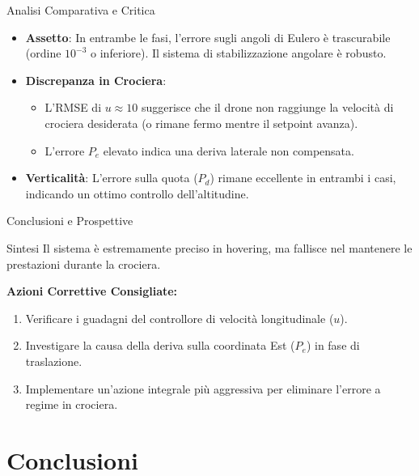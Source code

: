 \documentclass[aspectratio=169]{beamer} %
\begin{document}
\begin{frame}{Analisi Comparativa e Critica}
    \begin{itemize}
        \item \textbf{Assetto}: In entrambe le fasi, l'errore sugli angoli di Eulero è trascurabile (ordine $10^{-3}$ o inferiore). Il sistema di stabilizzazione angolare è robusto.
        \item \textbf{Discrepanza in Crociera}: 
        \begin{itemize}
            \item L'RMSE di $u \approx 10$ suggerisce che il drone non raggiunge la velocità di crociera desiderata (o rimane fermo mentre il setpoint avanza).
            \item L'errore $P_e$ elevato indica una deriva laterale non compensata.
        \end{itemize}
        \item \textbf{Verticalità}: L'errore sulla quota ($P_d$) rimane eccellente in entrambi i casi, indicando un ottimo controllo dell'altitudine.
    \end{itemize}
\end{frame}

\begin{frame}{Conclusioni e Prospettive}
    \begin{alertblock}{Sintesi}
        Il sistema è estremamente preciso in hovering, ma fallisce nel mantenere le prestazioni durante la crociera.
    \end{alertblock}
    \textbf{Azioni Correttive Consigliate:}
    \begin{enumerate}
        \item Verificare i guadagni del controllore di velocità longitudinale ($u$).
        \item Investigare la causa della deriva sulla coordinata Est ($P_e$) in fase di traslazione.
        \item Implementare un'azione integrale più aggressiva per eliminare l'errore a regime in crociera.
    \end{enumerate}
\end{frame}
\section{Conclusioni}
\end{document}
